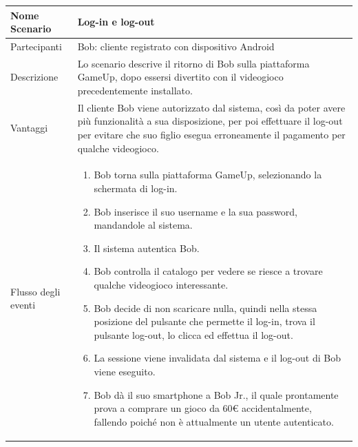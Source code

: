 	\small\begin{tabular}{|| l | p{30em} ||} 
	\hline
	Nome Scenario & Log-in e log-out\\
	\hline
	Partecipanti & Bob: cliente registrato con dispositivo Android\\
	\hline
	Descrizione & Lo scenario descrive il ritorno di Bob sulla piattaforma GameUp, dopo essersi divertito con il videogioco precedentemente installato.\\
	\hline
	Vantaggi & Il cliente Bob viene autorizzato dal sistema, così da poter avere più funzionalità a sua disposizione, per poi effettuare il log-out per evitare che suo figlio esegua erroneamente il pagamento per qualche videogioco.\\
	\hline
	Flusso degli eventi &
	\begin{enumerate}
		\item Bob torna sulla piattaforma GameUp, selezionando la schermata di log-in.
		\item Bob inserisce il suo username e la sua password, mandandole al sistema.
		\item Il sistema autentica Bob.
		\item Bob controlla il catalogo per vedere se riesce a trovare qualche videogioco interessante.
		\item Bob decide di non scaricare nulla, quindi nella stessa posizione del pulsante che permette il log-in, trova il pulsante log-out, lo clicca ed effettua il log-out.
		\item La sessione viene invalidata dal sistema e il log-out di Bob viene eseguito.
		\item Bob dà il suo smartphone a Bob Jr., il quale prontamente prova a comprare un gioco da 60€ accidentalmente, fallendo poiché non è attualmente un utente autenticato.
	\end{enumerate} \\
	\hline
	\end{tabular}

